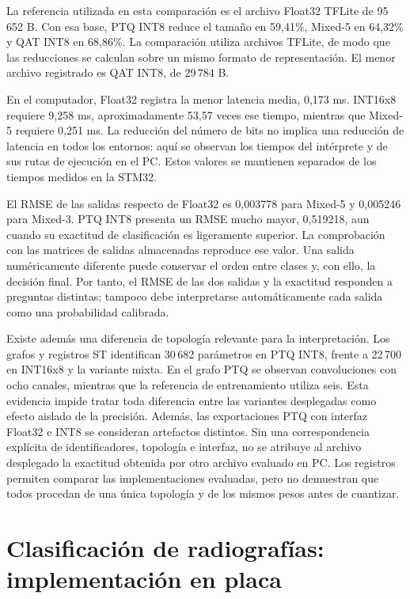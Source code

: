La referencia utilizada en esta comparación es el archivo Float32 TFLite de 95\,652 B. Con esa base, PTQ INT8 reduce el tamaño en 59,41\%, Mixed-5 en 64,32\% y QAT INT8 en 68,86\%. La comparación utiliza archivos TFLite, de modo que las reducciones se calculan sobre un mismo formato de representación. El menor archivo registrado es QAT INT8, de 29\,784 B.

En el computador, Float32 registra la menor latencia media, 0,173 ms. INT16x8 requiere 9,258 ms, aproximadamente 53,57 veces ese tiempo, mientras que Mixed-5 requiere 0,251 ms. La reducción del número de bits no implica una reducción de latencia en todos los entornos: aquí se observan los tiempos del intérprete y de sus rutas de ejecución en el PC. Estos valores se mantienen separados de los tiempos medidos en la STM32.

El RMSE de las salidas respecto de Float32 es 0,003778 para Mixed-5 y 0,005246 para Mixed-3. PTQ INT8 presenta un RMSE mucho mayor, 0,519218, aun cuando su exactitud de clasificación es ligeramente superior. La comprobación con las matrices de salidas almacenadas reproduce ese valor. Una salida numéricamente diferente puede conservar el orden entre clases y, con ello, la decisión final. Por tanto, el RMSE de las dos salidas y la exactitud responden a preguntas distintas; tampoco debe interpretarse automáticamente cada salida como una probabilidad calibrada.

Existe además una diferencia de topología relevante para la interpretación. Los grafos y registros ST identifican 30\,682 parámetros en PTQ INT8, frente a 22\,700 en INT16x8 y la variante mixta. En el grafo PTQ se observan convoluciones con ocho canales, mientras que la referencia de entrenamiento utiliza seis. Esta evidencia impide tratar toda diferencia entre las variantes desplegadas como efecto aislado de la precisión. Además, las exportaciones PTQ con interfaz Float32 e INT8 se consideran artefactos distintos. Sin una correspondencia explícita de identificadores, topología e interfaz, no se atribuye al archivo desplegado la exactitud obtenida por otro archivo evaluado en PC. Los registros permiten comparar las implementaciones evaluadas, pero no demuestran que todos procedan de una única topología y de los mismos pesos antes de cuantizar.

\FloatBarrier
\section{Clasificación de radiografías: implementación en placa}
\FloatBarrier
